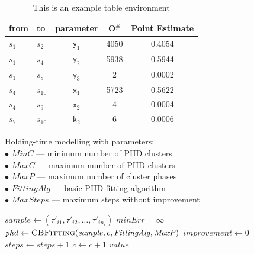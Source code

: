 \begin{table}[t]
	\sffamily
	\caption{This is an example table environment\label{tab:Example}}
	\centering
	\begin{tabular}{llccc} \toprule
		from & to & parameter & O$^{\#}$ & Point Estimate\\ \midrule
		$s_1$ & $s_2$ & $\textsf{y}_1$ & 4050  & 0.4054\\
		$s_1$ & $s_4$ & $\textsf{y}_2$ & 5938 & 0.5944\\
		$s_1$ & $s_8$ & $\textsf{y}_3$ & 2 & 0.0002 \\ \midrule
		$s_4$ & $s_{10}$ & $\textsf{x}_1$ & 5723 & 0.5622\\
		$s_4$ & $s_9$ & $\textsf{x}_2$ & 4 & 0.0004\\
		$s_7$ & $s_{10}$ & $\textsf{k}_2$ & 6 & 0.0006\\ \bottomrule
	\end{tabular}
\end{table}



\begin{algorithm}[t]
	\caption{Holding-time modelling with parameters:\\ \hspace*{3mm}$\bullet$ $\mathit{MinC}$ --- minimum number of PHD clusters\\ \hspace*{3mm}$\bullet$ $\mathit{MaxC}$ --- maximum number of PHD clusters\\ \hspace*{3mm}$\bullet$ $\mathit{MaxP}$ --- maximum number of cluster phases\\ \hspace*{3mm}$\bullet$ $\mathit{FittingAlg}$ --- basic PHD fitting algorithm\\ \hspace*{3mm}$\bullet$ $\mathit{MaxSteps}$ --- maximum steps without improvement \label{alg:example}}
	
	\begin{algorithmic}[1]
		\State $\mathit{sample}\gets (\tau'_{i1},\tau'_{i2},\ldots,\tau'_{in_i})$
		\State $\mathit{minErr}=\infty$
		\State $\mathit{phd} \gets \textsc{CBFitting}(\mathit{sample}, c, \mathit{FittingAlg}, \mathit{MaxP})$
		\State $\mathit{improvement} \gets 0$
		\Else
		\State $\mathit{steps} \gets \mathit{steps}+1$
		\EndIf
		\State $c \gets c+1$
		\EndWhile
		\State \Return $\mathit{value}$
		\EndFunction
	\end{algorithmic}
\end{algorithm}




